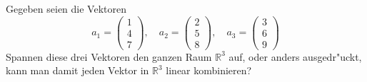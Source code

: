 \begin{beispiel}
Gegeben seien die Vektoren
\[
a_1=\begin{pmatrix}1\\4\\7\end{pmatrix},\quad
a_2=\begin{pmatrix}2\\5\\8\end{pmatrix},\quad
a_3=\begin{pmatrix}3\\6\\9\end{pmatrix}
\]
Spannen diese drei Vektoren den ganzen Raum $\mathbb R^3$ auf,
oder anders ausgedr"uckt, kann man damit jeden Vektor in $\mathbb R^3$
linear kombinieren?


\end{beispiel}
